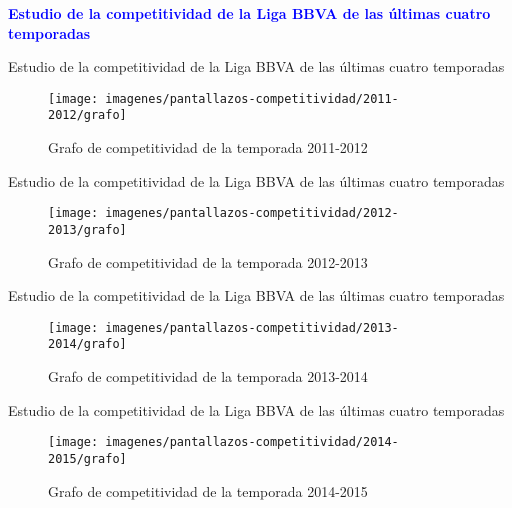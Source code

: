 \documentclass[10pt,hyperref={unicode}]{beamer}
\begin{document}
	\begin{frame}
		\begin{center}
			\Huge\textbf{\textsf{\textcolor{blue}{Estudio de la competitividad de la Liga BBVA de las últimas cuatro temporadas}}}
		\end{center}
	\end{frame}	
	
	\begin{frame}{Estudio de la competitividad de la Liga BBVA de las últimas cuatro temporadas}	
		\begin{figure}
			\centering
			\texttt{[image: imagenes/pantallazos-competitividad/2011-2012/grafo]}
			\caption{Grafo de competitividad de la temporada 2011-2012}
			\label{fig:2011-2012}
		\end{figure}
	\end{frame}
	
	\begin{frame}{Estudio de la competitividad de la Liga BBVA de las últimas cuatro temporadas}	
		\begin{figure}
			\centering
			\texttt{[image: imagenes/pantallazos-competitividad/2012-2013/grafo]}
			\caption{Grafo de competitividad de la temporada 2012-2013}
			\label{fig:2012-2013}
		\end{figure}
	\end{frame}
	
	\begin{frame}{Estudio de la competitividad de la Liga BBVA de las últimas cuatro temporadas}	
		\begin{figure}
			\centering
			\texttt{[image: imagenes/pantallazos-competitividad/2013-2014/grafo]}
			\caption{Grafo de competitividad de la temporada 2013-2014}
			\label{fig:2013-2014}
		\end{figure}
	\end{frame}
	
	\begin{frame}{Estudio de la competitividad de la Liga BBVA de las últimas cuatro temporadas}	
		\begin{figure}
			\centering
			\texttt{[image: imagenes/pantallazos-competitividad/2014-2015/grafo]}
			\caption{Grafo de competitividad de la temporada 2014-2015}
			\label{fig:2014-2015}
		\end{figure}
	\end{frame}
	
\end{document}
